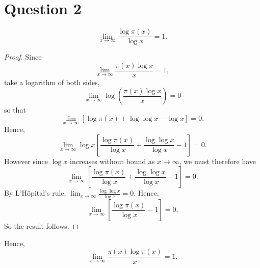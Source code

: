 \documentclass{unswmaths}
\begin{document}
\section*{Question 2}
    \begin{theorem}
    \label{q2a}
        \begin{equation*}
            \lim_{x\rightarrow\infty} \frac{\log{\pi(x)}}{\log{x}} = 1.
        \end{equation*}
    \end{theorem}
    \begin{proof}
        Since
        \begin{equation*}
            \lim_{x\rightarrow\infty} \frac{\pi(x)\log{x}}{x} = 1, 
        \end{equation*}
        take a logarithm of both sides,
        \begin{equation*}
            \lim_{x\rightarrow\infty} \log\left(\frac{\pi(x)\log{x}}{x}\right) = 0
        \end{equation*}
        so that
        \begin{equation*}
            \lim_{x\rightarrow\infty} [\log{\pi(x)}+\log{\log{x}}-\log{x}] = 0.
        \end{equation*}
        Hence,
        \begin{equation*}
            \lim_{x\rightarrow\infty} \log{x}\left[\frac{\log{\pi(x)}}{\log{x}}+\frac{\log{\log{x}}}{\log{x}}-1\right] = 0.
        \end{equation*}
        However since $\log{x}$ increases without bound as $x\rightarrow\infty$, we must therefore have
        \begin{equation*}
            \lim_{x\rightarrow\infty} \left[\frac{\log{\pi(x)}}{\log{x}}+\frac{\log{\log{x}}}{\log{x}}-1\right] = 0.
        \end{equation*}
        By L'H\^opital's rule, $\lim_{x\rightarrow\infty} \frac{\log{\log{x}}}{\log{x}} = 0$. 
        Hence,
        \begin{equation*}
            \lim_{x\rightarrow\infty} [\frac{\log{\pi(x)}}{\log{x}}-1] = 0.
        \end{equation*}
        So the result follows.
    \end{proof}
    \begin{lemma}
    \label{q2c}
        Hence,
        \begin{equation*}
            \lim_{x\rightarrow\infty} \frac{\pi(x)\log{\pi(x)}}{x} = 1.
        \end{equation*}
    \end{lemma}
\end{document}
